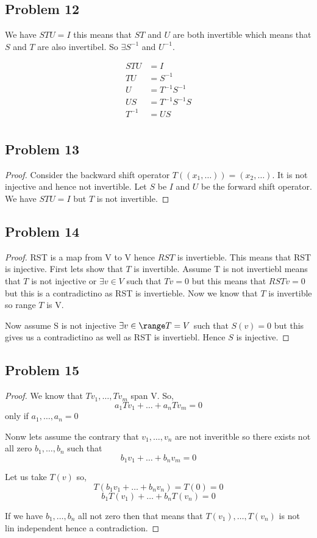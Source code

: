 \documentclass[a4paper]{report}
\begin{document}
\subsection*{Problem 12}
We have $STU = I$ this means that $ST$ and  $U$ are both invertible which means that $S$ and $T$ are also invertibel. So $\exists S^{-1}$ and $U^{-1}$.

\begin{align*}
    STU &= I\\
    TU &= S^{-1}\\
    U &= T^{-1}S^{-1}\\
    US &= T^{-1}S^{-1}S\\
    T^{-1} &= US\\
\end{align*}


\subsection*{Problem 13}
\begin{proof}
    Consider the backward shift operator $T((x_1,\dots)) = (x_2,\dots)$. It is not injective and hence not invertible. Let $S$ be $I$ and $U$ be the forward shift operator. We have $STU = I$ but $T$ is not invertible.
\end{proof}
\subsection*{Problem 14}
\begin{proof}
    RST is a map from V to V hence $RST$ is invertieble. This means that RST is injective. First lets show that  $T$ is invertible. Assume T is not invertiebl means that $T$ is not injective or $\exists v \in V$ such that $Tv = 0$ but this means that $RSTv = 0$ but this is a contradictino as RST is invertieble.  Now we know that $T$ is invertible so range $T$ is V.

    Now assume S is not injective $\exists v \in \range T = V$ such that $S(v) = 0$ but this gives us a contradictino as well as RST  is invertiebl. Hence $S$ is injective.

\end{proof}
\subsection*{Problem 15}
\begin{proof}
    We know that $Tv_1,\dots,Tv_m$ span V. So, 
    $$ a_1Tv_1 + \dots + a_nTv_m = 0 $$  only if $a_1,\dots,a_n = 0$

    Nonw lets assume the contrary that $v_1,\dots,v_n$ are not inveritble so there exists not all zero $b_1,\dots,b_n$ such that
    $$ b_1v_1 + \dots + b_nv_m = 0 $$ 

    Let us take $T(v)$ so,  
    $$ T(b_1v_1+ \dots + b_nv_n) = T(0) = 0 $$ 
    $$ b_1T(v_1) + \dots + b_nT(v_n) = 0 $$ 

    If we have $b_1,\dots,b_n$ all not zero then that means that $T(v_1) ,\dots,T(v_n)$ is not lin independent hence a contradiction.
\end{proof}
\end{document}
